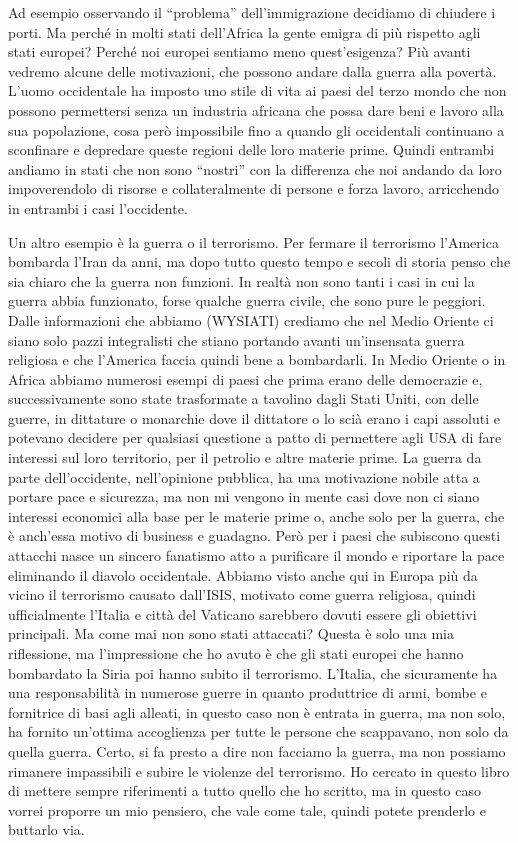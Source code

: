 \documentclass[12pt]{book} %
\begin{document}
Ad esempio osservando il “problema” dell'immigrazione decidiamo di chiudere i porti. Ma perché in
molti stati dell'Africa la gente emigra di più rispetto agli stati europei? Perché noi europei
sentiamo meno quest'esigenza? Più avanti vedremo alcune delle motivazioni, che possono andare
dalla guerra alla povertà. L'uomo occidentale ha imposto uno stile di vita ai paesi del terzo
mondo che non possono permettersi senza un industria africana che possa dare beni e lavoro alla sua popolazione, cosa
però impossibile fino a quando gli occidentali continuano a sconfinare e depredare queste regioni delle loro materie
prime. Quindi entrambi andiamo in stati che non sono “nostri” con la differenza che noi andando da loro impoverendolo
di risorse e collateralmente di persone e forza lavoro, arricchendo in entrambi i casi
l'occidente.

Un altro esempio è la guerra o il terrorismo. Per fermare il terrorismo l'America bombarda
l'Iran da anni, ma dopo tutto questo tempo e secoli di storia penso che sia chiaro che la guerra
non funzioni. In realtà non sono tanti i casi in cui la guerra abbia funzionato, forse qualche guerra civile, che sono
pure le peggiori. Dalle informazioni che abbiamo (WYSIATI) crediamo che nel Medio Oriente ci siano solo pazzi
integralisti che stiano portando avanti un'insensata guerra religiosa e che
l'America faccia quindi bene a bombardarli. In Medio Oriente o in Africa abbiamo numerosi esempi
di paesi che prima erano delle democrazie e, successivamente sono state trasformate a tavolino dagli Stati Uniti, con
delle guerre, in dittature o monarchie dove il dittatore o lo scià erano i capi assoluti e potevano decidere per
qualsiasi questione a patto di permettere agli USA di fare interessi sul loro territorio, per il petrolio e altre
materie prime. La guerra da parte dell'occidente, nell'opinione pubblica, ha
una motivazione nobile atta a portare pace e sicurezza, ma non mi vengono in mente casi dove non ci siano interessi
economici alla base per le materie prime o, anche solo per la guerra, che è anch'essa motivo di
business e guadagno. Però per i paesi che subiscono questi attacchi nasce un sincero fanatismo atto a purificare il
mondo e riportare la pace eliminando il diavolo occidentale. Abbiamo visto anche qui in Europa più da vicino il
terrorismo causato dall'ISIS, motivato come guerra religiosa, quindi ufficialmente
l'Italia e città del Vaticano sarebbero dovuti essere gli obiettivi principali. Ma come mai non
sono stati attaccati? Questa è solo una mia riflessione, ma l'impressione che ho avuto è che gli
stati europei che hanno bombardato la Siria poi hanno subito il terrorismo. L'Italia, che
sicuramente ha una responsabilità in numerose guerre in quanto produttrice di armi, bombe e fornitrice di basi agli
alleati, in questo caso non è entrata in guerra, ma non solo, ha fornito un'ottima accoglienza per
tutte le persone che scappavano, non solo da quella guerra. Certo, si fa presto a dire non facciamo la guerra, ma non
possiamo rimanere impassibili e subire le violenze del terrorismo. Ho cercato in questo libro di mettere sempre
riferimenti a tutto quello che ho scritto, ma in questo caso vorrei proporre un mio pensiero, che vale come tale,
quindi potete prenderlo e buttarlo via.
\end{document}
